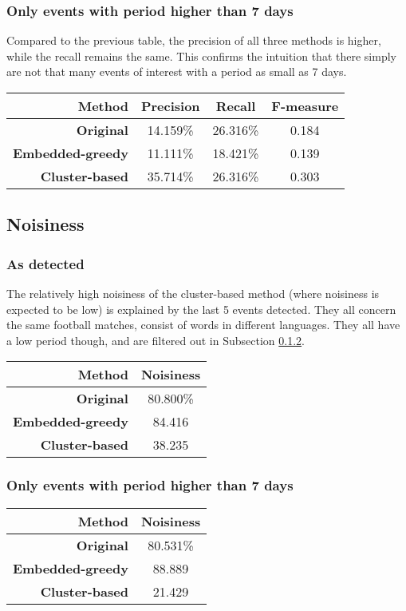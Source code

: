 \documentclass[a4paper]{article}
\begin{document}
\subsubsection{Only events with period higher than 7 days}
Compared to the previous table, the precision of all three methods is higher, while the recall remains the same. This confirms the intuition that there simply are not that many events of interest with a period as small as 7 days.
\begin{center}
\begin{tabular}{r c c c} \toprule[1.5pt]
\bf Method & \bf Precision & \bf Recall & \bf F-measure \\ \midrule
\bf Original & 14.159\% & 26.316\% & 0.184 \\
\bf Embedded-greedy & 11.111\% & 18.421\% & 0.139 \\
\bf Cluster-based & 35.714\% & 26.316\% & 0.303 \\ \bottomrule[1.25pt]
\end{tabular}
\end{center}


\subsection{Noisiness}
\subsubsection{As detected}
The relatively high noisiness of the cluster-based method (where noisiness is expected to be low) is explained by the last 5 events detected. They all concern the same football matches, consist of words in different languages. They all have a low period though, and are filtered out in Subsection \ref{noisiness-high-period}.

\begin{center}
\begin{tabular}{r c} \toprule[1.5pt]
\bf Method & \bf Noisiness \\ \midrule
\bf Original & 80.800\% \\
\bf Embedded-greedy & 84.416 \\
\bf Cluster-based & 38.235 \\ \bottomrule[1.25pt]
\end{tabular}
\end{center}

\subsubsection{Only events with period higher than 7 days} \label{noisiness-high-period}
\begin{center}
\begin{tabular}{r c} \toprule[1.5pt]
\bf Method & \bf Noisiness \\ \midrule
\bf Original & 80.531\% \\
\bf Embedded-greedy & 88.889 \\
\bf Cluster-based & 21.429 \\ \bottomrule[1.25pt]
\end{tabular}
\end{center}
\end{document}
